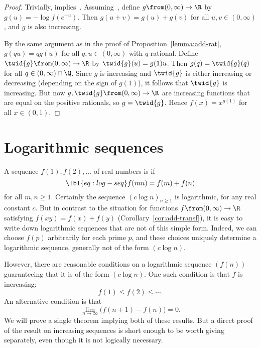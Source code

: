 \begin{proof}
Trivially, 
implies~.
Assuming~, define $g \from (0, \infty) \to
\R$ by $g(u) = -\log f(e^{-u})$.  Then $g(u + v) = g(u) + g(v)$ for all $u,
v \in (0, \infty)$, and $g$ is also increasing.

By the same argument as in the proof of Proposition~\ref{lemma:add-rat},
$g(qu) = qg(u)$ for all $q, u \in (0, \infty)$ with $q$ rational.  Define
$\twid{g} \from (0, \infty) \to \R$ by $\twid{g}(u) = g(1)u$.  Then $g(q) =
\twid{g}(q)$ for all $q \in (0, \infty) \cap \Q$.  Since $g$ is increasing
and $\twid{g}$ is either increasing or decreasing (depending on the sign of
$g(1)$), it follows that $\twid{g}$ is increasing.  But now $g, \twid{g}
\from (0, \infty) \to \R$ are increasing functions that are equal on the
positive rationals, so $g = \twid{g}$.  Hence $f(x) = x^{g(1)}$ for all $x
\in (0, 1)$.
\end{proof}


\section{Logarithmic sequences}


A sequence $f(1), f(2), \ldots$ of real numbers is
%
%
% 
if
% 
\begin{equation}
\lbl{eq:log-seq}
f(mn) = f(m) + f(n)
\end{equation}
% 
for all $m, n \geq 1$.  Certainly the sequence $(c \log n)_{n \geq 1}$ is
logarithmic, for any real constant $c$.  But in contrast to the situation
for functions $f \from (0, \infty) \to \R$ satisfying $f(xy) = f(x) + f(y)$
(Corollary~\ref{cor:add-transf}), it is easy to
write down logarithmic sequences that are not of this simple form.  Indeed,
we can choose $f(p)$ arbitrarily for each prime $p$, and these choices
uniquely determine a logarithmic sequence, generally not of the form $(c
\log n)$.

However, there are reasonable conditions on a logarithmic sequence
$(f(n))$ guaranteeing that it is of the form $(c \log n)$.  One such
condition is that $f$ is increasing:
\[
f(1) \leq f(2) \leq \cdots.
\]
An alternative condition is that
\[
\lim_{n \to \infty} \bigl(f(n + 1) - f(n)\bigr) = 0.
\]
We will prove a single theorem implying both of these results.  But a
direct proof of the result on increasing sequences is short enough to be
worth giving separately, even though it is not logically necessary.


